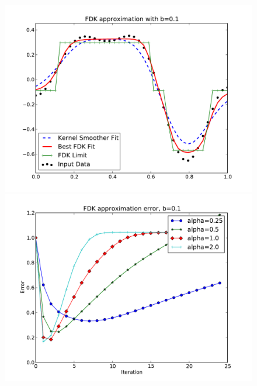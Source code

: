 \begin{figure}[!htb]
    \includegraphics[width=\linewidth]{./figs/bumpy1.pdf}
  \endminipage\hfill
    \includegraphics[width=\linewidth]{./figs/bumpyerr1.pdf}
  \endminipage
\end{figure}


